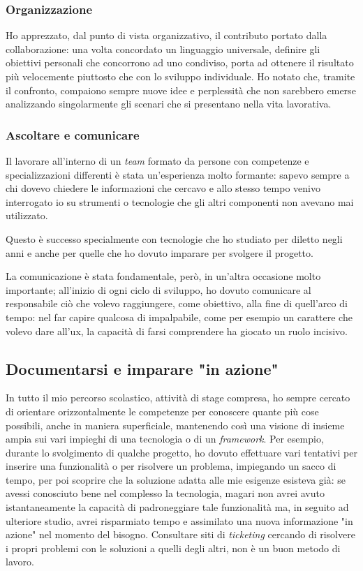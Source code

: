 \subsubsection{Organizzazione}
Ho apprezzato, dal punto di vista organizzativo, il contributo portato dalla collaborazione: una volta concordato un linguaggio universale, definire gli obiettivi personali che concorrono ad uno condiviso, porta ad ottenere il risultato più velocemente piuttosto che con lo sviluppo individuale.
Ho notato che, tramite il confronto, compaiono sempre nuove idee e perplessità che non sarebbero emerse analizzando singolarmente gli scenari che si presentano nella vita lavorativa.
\newpage
\subsubsection{Ascoltare e comunicare}
\label{ssec:ascoltareComunicare}
Il lavorare all'interno di un \textit{team} formato da persone con competenze e specializzazioni differenti è stata un'esperienza molto formante: sapevo sempre a chi dovevo chiedere le informazioni che cercavo e allo stesso tempo venivo interrogato io su strumenti o tecnologie che gli altri componenti non avevano mai utilizzato.

Questo è successo specialmente con tecnologie che ho studiato per diletto negli anni e anche per quelle che ho dovuto imparare per svolgere il progetto.

La comunicazione è stata fondamentale, però, in un'altra occasione molto importante; all'inizio di ogni ciclo di sviluppo, ho dovuto comunicare al responsabile ciò che volevo raggiungere, come obiettivo, alla fine di quell'arco di tempo: nel far capire qualcosa di impalpabile, come per esempio un carattere che volevo dare all'\acrshort{ux}, la capacità di farsi comprendere ha giocato un ruolo incisivo.
\subsection{Documentarsi e imparare "in azione"}
In tutto il mio percorso scolastico, attività di stage compresa, ho sempre cercato di orientare orizzontalmente le competenze per conoscere quante più cose possibili, anche in maniera superficiale, mantenendo così una visione di insieme ampia sui vari impieghi di una tecnologia o di un \textit{framework}.
Per esempio, durante lo svolgimento di qualche progetto, ho dovuto effettuare vari tentativi per inserire una funzionalità o per risolvere un problema, impiegando un sacco di tempo, per poi scoprire che la soluzione adatta alle mie esigenze esisteva già: se avessi conosciuto bene nel complesso la tecnologia, magari non avrei avuto istantaneamente la capacità di padroneggiare tale funzionalità ma, in seguito ad ulteriore studio, avrei risparmiato tempo e assimilato una nuova informazione "in azione" nel momento del bisogno. Consultare siti di \textit{ticketing} cercando di risolvere i propri problemi con le soluzioni a quelli degli altri, non è un buon metodo di lavoro.
